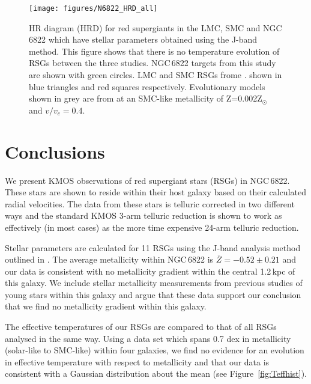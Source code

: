 \documentclass[manuscript]{aastex}
\begin{document}
\begin{figure}
\texttt{[image: figures/N6822\_HRD\_all]}
\caption{
HR diagram (HRD) for red supergiants in the LMC, SMC and NGC\,6822 which have stellar parameters obtained using the J-band method.
This figure shows that there is no temperature evolution of RSGs between the three studies.
NGC\,6822 targets from this study are shown with green circles.
LMC and SMC RSGs frome
\protect\cite{2014ApJ...788...58G}.
shown in blue triangles and red squares respectively.
Evolutionary models shown in grey are from
\protect\cite{2013A&A...558A.103G} at an SMC-like metallicity of
Z=0.002Z$_{\odot}$ and $v/v_{c} = 0.4$.
        }
\label{fig:HRD}
\end{figure}




\section{Conclusions} %
\label{sec:conclusions}

We present KMOS observations of red supergiant stars (RSGs) in NGC\,6822.
These stars are shown to reside within their host galaxy based on their calculated radial velocities.
The data from these stars is telluric corrected in two different ways and the standard KMOS 3-arm telluric reduction is shown to work as effectively (in most cases) as the more time expensive 24-arm telluric reduction.

Stellar parameters are calculated for 11 RSGs using the J-band analysis method outlined in
\cite{Davies10}.
The average metallicity within NGC\,6822 is
$\bar{Z} = -0.52\pm 0.21$ and our data is consistent with no metallicity gradient within the central 1.2\,kpc of this galaxy.
We include stellar metallicity measurements from previous studies of young stars within this galaxy and argue that these data support our conclusion that we find no metallicity gradient within this galaxy.

The effective temperatures of our RSGs are compared to that of all RSGs analysed in the same way.
Using a data set which spans 0.7 dex in metallicity (solar-like to SMC-like) within four galaxies, we find no evidence for an evolution in effective temperature with respect to metallicity and that our data is consistent with a Gaussian distribution about the mean (see Figure~\ref{fig:Teffhist}).
\end{document}
